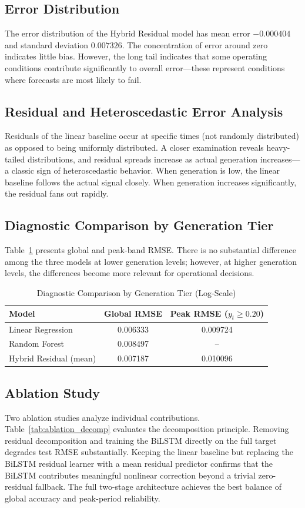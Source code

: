 \documentclass{ieeeaccess}
\begin{document}
\subsection{Error Distribution}
The error distribution of the Hybrid Residual model has mean error $-0.000404$ and standard deviation $0.007326$. The concentration of error around zero indicates little bias. However, the long tail indicates that some operating conditions contribute significantly to overall error---these represent conditions where forecasts are most likely to fail.

\subsection{Residual and Heteroscedastic Error Analysis}
Residuals of the linear baseline occur at specific times (not randomly distributed) as opposed to being uniformly distributed. A closer examination reveals heavy-tailed distributions, and residual spreads increase as actual generation increases---a classic sign of heteroscedastic behavior. When generation is low, the linear baseline follows the actual signal closely. When generation increases significantly, the residual fans out rapidly.

\subsection{Diagnostic Comparison by Generation Tier}
Table~\ref{tab:diagnostic_tier} presents global and peak-band RMSE. There is no substantial difference among the three models at lower generation levels; however, at higher generation levels, the differences become more relevant for operational decisions.

\begin{table}[!t]
\caption{Diagnostic Comparison by Generation Tier (Log-Scale)}
\label{tab:diagnostic_tier}
\centering
\begin{tabular}{lcc}
\toprule
Model & Global RMSE & Peak RMSE ($y_t \ge 0.20$) \\
\midrule
Linear Regression & 0.006333 & 0.009724 \\
Random Forest & 0.008497 & -- \\
Hybrid Residual (mean) & 0.007187 & 0.010096 \\
\bottomrule
\end{tabular}
\end{table}

\subsection{Ablation Study}
Two ablation studies analyze individual contributions. Table~\ref{tab:ablation_decomp} evaluates the decomposition principle. Removing residual decomposition and training the BiLSTM directly on the full target degrades test RMSE substantially. Keeping the linear baseline but replacing the BiLSTM residual learner with a mean residual predictor confirms that the BiLSTM contributes meaningful nonlinear correction beyond a trivial zero-residual fallback. The full two-stage architecture achieves the best balance of global accuracy and peak-period reliability.
\end{document}
